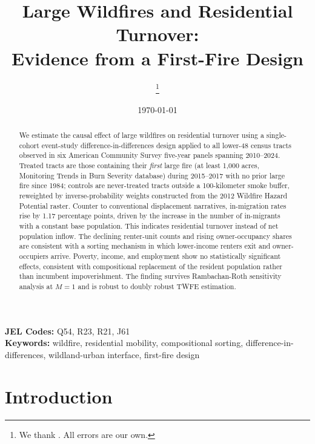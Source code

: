 \documentclass[12pt]{article}
\title{Large Wildfires and Residential Turnover:\\
       Evidence from a First-Fire Design}
\author{\ph{Author Name(s)}\thanks{%
  \ph{Affiliation. Email: author@institution.edu.}
  We thank \ph{[acknowledgments]}. All errors are our own.}}
\date{\today}
\begin{document}
\maketitle

\begin{abstract}
\noindent
We estimate the causal effect of large wildfires on residential turnover
using a single-cohort event-study difference-in-differences design
applied to all lower-48 census tracts observed in six American Community
Survey five-year panels spanning 2010--2024.
Treated tracts are those containing their \emph{first} large fire
(at least 1,000 acres, Monitoring Trends in Burn Severity database)
during 2015--2017 with no prior large fire since 1984;
controls are never-treated tracts outside a 100-kilometer smoke buffer,
reweighted by inverse-probability weights constructed from the
2012 Wildfire Hazard Potential raster.
Counter to conventional displacement narratives,
in-migration rates rise by 1.17 percentage points, driven by the increase
in the number of in-migrants with a constant base population.
This indicates residential turnover instead of net population inflow.
The declining renter-unit counts and rising owner-occupancy shares are
consistent with a sorting mechanism in which lower-income renters exit
and owner-occupiers arrive. Poverty, income, and employment show
no statistically significant effects, consistent with compositional replacement
of the resident population rather than incumbent impoverishment.
The finding survives Rambachan-Roth sensitivity analysis
at $M = 1$ and is robust to doubly robust TWFE estimation.
\end{abstract}

\textbf{JEL Codes:} Q54, R23, R21, J61 \\
\textbf{Keywords:} wildfire, residential mobility, compositional sorting,
                    difference-in-differences, wildland-urban interface,
                    first-fire design

\clearpage

\section{Introduction}
\label{sec:intro}
\end{document}
